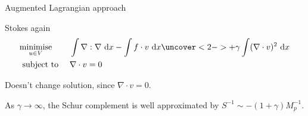 \documentclass[presentation,aspectratio=43, 10pt]{beamer}
\newcommand{\dx}{\ \text{d}x}
\begin{document}
\begin{frame}{Augmented Lagrangian approach}
  \begin{block}{Stokes again}
    \begin{equation*}
      \begin{aligned}
        & \underset{u\in V}{\text{minimise}} & & \int \nabla : \nabla \dx
        - \int f \cdot v \dx \uncover<2->{+ \gamma \int (\nabla \cdot
          v)^2 \dx}\\
        &\text{ subject to } & & \nabla \cdot v = 0
      \end{aligned}
    \end{equation*}
  \end{block}

  \pause
  \pause Doesn't change solution, since $\nabla \cdot v = 0$.

  \begin{theorem}
    As $\gamma \to \infty$, the Schur complement is well
    approximated by $S^{-1} \sim -(1 + \gamma)M_p^{-1}$.
  \end{theorem}
\end{frame}
\end{document}
